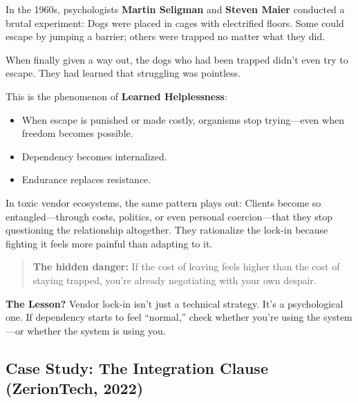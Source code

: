\begin{tcolorbox}[colback=blue!5!white, colframe=blue!50!black,
  title={Psychological Sidebar: Learned Helplessness — When Escape Costs More Than Staying}]

In the 1960s, psychologists \textbf{Martin Seligman} and \textbf{Steven Maier} conducted a brutal experiment:  
Dogs were placed in cages with electrified floors.  
Some could escape by jumping a barrier; others were trapped no matter what they did.

\medskip

When finally given a way out, the dogs who had been trapped didn’t even try to escape.  
They had learned that struggling was pointless.

\medskip

This is the phenomenon of \textbf{Learned Helplessness}:
\begin{itemize}
    \item When escape is punished or made costly, organisms stop trying—even when freedom becomes possible.
    \item Dependency becomes internalized.
    \item Endurance replaces resistance.
\end{itemize}

\medskip

In toxic vendor ecosystems, the same pattern plays out:  
Clients become so entangled—through costs, politics, or even personal coercion—that they stop questioning the relationship altogether.  
They rationalize the lock-in because fighting it feels more painful than adapting to it.

\medskip

\begin{quote}
\textbf{The hidden danger:} If the cost of leaving feels higher than the cost of staying trapped, you're already negotiating with your own despair.
\end{quote}

\medskip

\textbf{The Lesson?} Vendor lock-in isn’t just a technical strategy. It’s a psychological one. If dependency starts to feel “normal,” check whether you’re using the system—or whether the system is using you.
\end{tcolorbox}

\subsection{Case Study: The Integration Clause (ZerionTech, 2022)}

